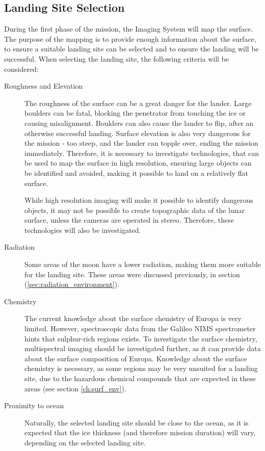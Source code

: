 \subsection{Landing Site Selection}
During the first phase of the mission, the Imaging System will map the surface. The purpose of the mapping is to provide enough information about the surface, to ensure a suitable landing site can be selected and to ensure the landing will be successful. When selecting the landing site, the following criteria will be considered:
\begin{description}
    \item[Roughness and Elevation] The roughness of the surface can be a great danger for the lander. Large boulders can be fatal, blocking the penetrator from touching the ice or causing misalignment. Boulders can also cause the lander to flip, after an otherwise successful landing. Surface elevation is also very dangerous for the mission - too steep, and the lander can topple over, ending the mission immediately. Therefore, it is necessary to investigate technologies, that can be used to map the surface in high resolution, ensuring large objects can be identified and avoided, making it possible to land on a relatively flat surface.
    
    While high resolution imaging will make it possible to identify dangerous objects, it may not be possible to create topographic data of the lunar surface, unless the cameras are operated in stereo. Therefore, these technologies will also be investigated.
    \item[Radiation] Some areas of the moon have a lower radiation, making them more suitable for the landing site. These areas were discussed previously, in section (\ref{sec:radiation_environment}).
    \item[Chemistry] The current knowledge about the surface chemistry of Europa is very limited. However, spectroscopic data from the Galileo NIMS spectrometer hints that sulphur-rich regions exists. To investigate the surface chemistry, multispectral imaging should be investigated further, as it can provide data about the surface composition of Europa. Knowledge about the surface chemistry is necessary, as some regions may be very unsuited for a landing site, due to the hazardous chemical compounds that are expected in these areas (see section \ref{ch:surf_env}).
    \item[Proximity to ocean] Naturally, the selected landing site should be close to the ocean, as it is expected that the ice thickness (and therefore mission duration) will vary, depending on the selected landing site.
    

\end{description}
